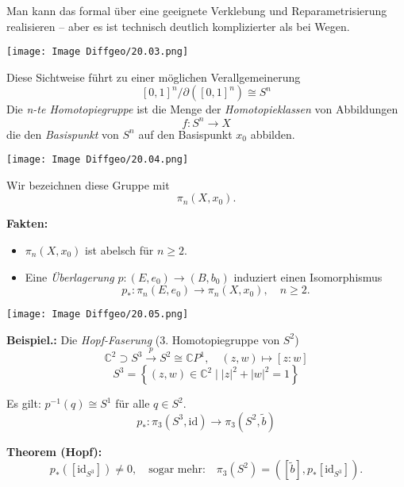 \documentclass[fleqn, 12pt, letterpaper]{article}
\begin{document}
Man kann das formal über eine geeignete Verklebung und Reparametrisierung realisieren – 
aber es ist technisch deutlich komplizierter als bei Wegen.


\begin{center}
\texttt{[image: Image Diffgeo/20.03.png]}
\end{center}

\noindent
Diese Sichtweise führt zu einer möglichen Verallgemeinerung
\[
[0,1]^n / \partial([0,1]^n) \cong S^n
\]
Die \emph{n-te Homotopiegruppe} ist die Menge der \emph{Homotopieklassen} von Abbildungen
\[
f: S^n\longrightarrow X
\]
die den \emph{Basispunkt} von \( S^n \) auf den Basispunkt \( x_0 \) abbilden.

\begin{center}
\texttt{[image: Image Diffgeo/20.04.png]}
\end{center}

Wir bezeichnen diese Gruppe mit
\[
\pi_n(X, x_0).
\]

\textbf{{Fakten:}}
\begin{itemize}
    \item $\pi_n(X, x_0)$ ist abelsch für $n \geq 2$.
    \item Eine \emph{Überlagerung} $p : (E, e_0) \to (B, b_0)$ induziert einen Isomorphismus
    \[
    p_* : \pi_n(E, e_0) \longrightarrow \pi_n(X, x_0), \quad n \geq 2.
    \]
\end{itemize}

\begin{center}
\texttt{[image: Image Diffgeo/20.05.png]}
\end{center}

\textbf{{Beispiel.:}} Die \emph{Hopf-Faserung} (3. Homotopiegruppe von $S^2$)
\[
\mathbb{C}^2 \supset S^3 \xrightarrow{p} S^2 \cong \mathbb{C}P^1, \quad (z, w) \mapsto [z : w]
\]
\[
S^3 = \left\{ (z, w) \in \mathbb{C}^2 \mid |z|^2 + |w|^2 = 1 \right\}
\]

Es gilt: \quad $p^{-1}(q) \cong S^1$ \quad für alle $q \in S^2$.
\[
p_* : \pi_3(S^3, \mathrm{id}) \longrightarrow \pi_3(S^2, \tilde{b})
\]

\textbf{{Theorem (Hopf):}} \quad
\[
p_*\left( [\mathrm{id}_{S^3}] \right) \neq 0, \quad \text{sogar mehr:} \quad \pi_3(S^2) = ([\tilde{b}], p_*[\mathrm{id}_{S^3}]).
\]

\end{document}

